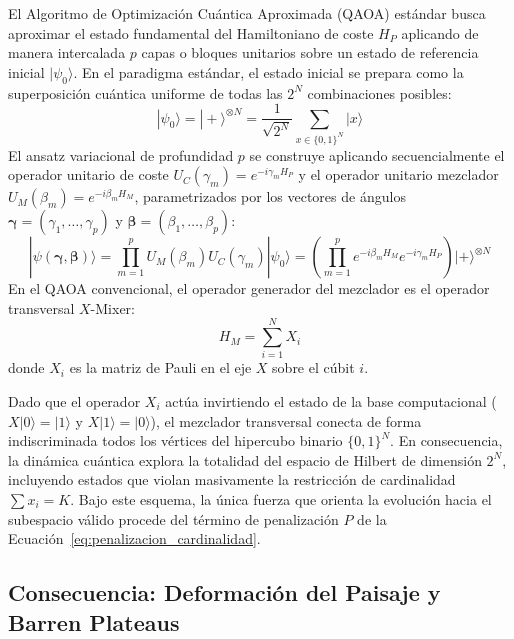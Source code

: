 El Algoritmo de Optimización Cuántica Aproximada (QAOA) estándar \cite{Farhi2014} busca aproximar el estado fundamental del Hamiltoniano de coste $H_P$ aplicando de manera intercalada $p$ capas o bloques unitarios sobre un estado de referencia inicial $|\psi_0\rangle$. En el paradigma estándar, el estado inicial se prepara como la superposición cuántica uniforme de todas las $2^N$ combinaciones posibles:
\begin{equation}
    |\psi_0\rangle = |+\rangle^{\otimes N} = \frac{1}{\sqrt{2^N}} \sum_{x \in \{0,1\}^N} |x\rangle
    \label{eq:superposicion_uniforme}
\end{equation}
El ansatz variacional de profundidad $p$ se construye aplicando secuencialmente el operador unitario de coste $U_C(\gamma_m) = e^{-i \gamma_m H_P}$ y el operador unitario mezclador $U_M(\beta_m) = e^{-i \beta_m H_M}$, parametrizados por los vectores de ángulos $\boldsymbol{\gamma} = (\gamma_1, \dots, \gamma_p)$ y $\boldsymbol{\beta} = (\beta_1, \dots, \beta_p)$:
\begin{equation}
    |\psi(\boldsymbol{\gamma}, \boldsymbol{\beta})\rangle = \prod_{m=1}^{p} U_M(\beta_m) U_C(\gamma_m) |\psi_0\rangle = \left( \prod_{m=1}^{p} e^{-i \beta_m H_M} e^{-i \gamma_m H_P} \right) |+\rangle^{\otimes N}
    \label{eq:ansatz_qaoa}
\end{equation}
En el QAOA convencional, el operador generador del mezclador es el operador transversal $X$-Mixer:
\begin{equation}
    H_M = \sum_{i=1}^N X_i
    \label{eq:mezclador_x}
\end{equation}
donde $X_i$ es la matriz de Pauli en el eje $X$ sobre el cúbit $i$.

Dado que el operador $X_i$ actúa invirtiendo el estado de la base computacional ($X|0\rangle = |1\rangle$ y $X|1\rangle = |0\rangle$), el mezclador transversal conecta de forma indiscriminada todos los vértices del hipercubo binario $\{0,1\}^N$. En consecuencia, la dinámica cuántica explora la totalidad del espacio de Hilbert de dimensión $2^N$, incluyendo estados que violan masivamente la restricción de cardinalidad $\sum x_i = K$. Bajo este esquema, la única fuerza que orienta la evolución hacia el subespacio válido procede del término de penalización $P$ de la Ecuación~\eqref{eq:penalizacion_cardinalidad}.

\subsection{Consecuencia: Deformación del Paisaje y Barren Plateaus}
\label{subsec:barren_plateaus}

